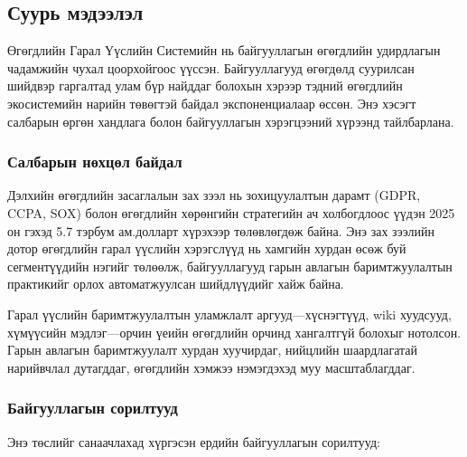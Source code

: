 \subsection{Суурь мэдээлэл}
\label{subsec:dl_background}

Өгөгдлийн Гарал Үүслийн Системийн нь байгууллагын өгөгдлийн удирдлагын чадамжийн чухал цоорхойгоос үүссэн. Байгууллагууд өгөгдөлд суурилсан шийдвэр гаргалтад улам бүр найддаг болохын хэрээр тэдний өгөгдлийн экосистемийн нарийн төвөгтэй байдал экспоненциалаар өссөн. Энэ хэсэгт салбарын өргөн хандлага болон байгууллагын хэрэгцээний хүрээнд тайлбарлана.

\subsubsection{Салбарын нөхцөл байдал}

Дэлхийн өгөгдлийн засаглалын зах зээл нь зохицуулалтын дарамт (GDPR, CCPA, SOX) болон өгөгдлийн хөрөнгийн стратегийн ач холбогдлоос үүдэн 2025 он гэхэд 5.7 тэрбум ам.долларт хүрэхээр төлөвлөгдөж байна. Энэ зах зээлийн дотор өгөгдлийн гарал үүслийн хэрэгслүүд нь хамгийн хурдан өсөж буй сегментүүдийн нэгийг төлөөлж, байгууллагууд гарын авлагын баримтжуулалтын практикийг орлох автоматжуулсан шийдлүүдийг хайж байна.

Гарал үүслийн баримтжуулалтын уламжлалт аргууд---хүснэгтүүд, wiki хуудсууд, хүмүүсийн мэдлэг---орчин үеийн өгөгдлийн орчинд хангалтгүй болохыг нотолсон. Гарын авлагын баримтжуулалт хурдан хуучирдаг, нийцлийн шаардлагатай нарийвчлал дутагддаг, өгөгдлийн хэмжээ нэмэгдэхэд муу масштаблагддаг.

\subsubsection{Байгууллагын сорилтууд}

Энэ төслийг санаачлахад хүргэсэн ердийн байгууллагын сорилтууд:

